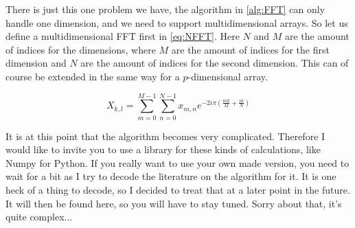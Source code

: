There is just this one problem we have, the algorithm in \autoref{alg:FFT} can only handle one dimension, and we need to support multidimensional arrays. So let us define a multidimensional FFT 
first in \autoref{eq:NFFT}. Here $N$ and $M$ are the amount of indices for the dimensions, where $M$ are the amount of indices for the first dimension and $N$ are the amount of indices for the 
second dimension. This can of course be extended in the same way for a $p$-dimensional array.

\begin{equation}
    X_{k,l} = \sum_{m = 0}^{M - 1}\sum_{n = 0}^{N - 1} x_{m, n}e^{-2i\pi(\frac{mk}{M} + \frac{nl}{N})}
    \label{eq:NFFT}
\end{equation}

It is at this point that the algorithm becomes very complicated. Therefore I would like to invite you to use a library for these kinds of calculations, like Numpy \cite{numpy} for Python. If you
really want to use your own made version, you need to wait for a bit as I try to decode the literature on the algorithm for it. It is one heck of a thing to decode, so I decided to treat that at 
a later point in the future. It will then be found here, so you will have to stay tuned. Sorry about that, it's quite complex...